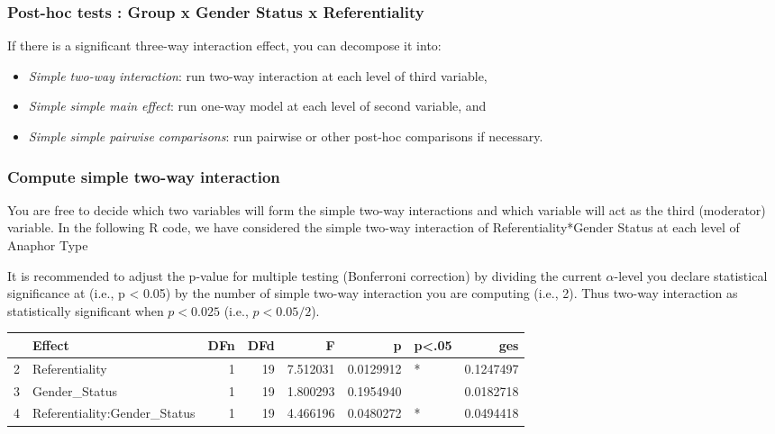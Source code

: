 \documentclass[
]{article}
\begin{document}
\subsubsection{Post-hoc tests : Group x Gender Status x
Referentiality}\label{post-hoc-tests-group-x-gender-status-x-referentiality}

If there is a significant three-way interaction effect, you can
decompose it into:

\begin{itemize}
\item
  \emph{Simple two-way interaction}: run two-way interaction at each
  level of third variable,
\item
  \emph{Simple simple main effect}: run one-way model at each level of
  second variable, and
\item
  \emph{Simple simple pairwise comparisons}: run pairwise or other
  post-hoc comparisons if necessary.
\end{itemize}

\subsubsection{Compute simple two-way
interaction}\label{compute-simple-two-way-interaction}

You are free to decide which two variables will form the simple two-way
interactions and which variable will act as the third (moderator)
variable. In the following R code, we have considered the simple two-way
interaction of Referentiality*Gender Status at each level of Anaphor
Type

It is recommended to adjust the p-value for multiple testing (Bonferroni
correction) by dividing the current \(\alpha\)-level you declare
statistical significance at (i.e., p \textless{} 0.05) by the number of
simple two-way interaction you are computing (i.e., 2). Thus two-way
interaction as statistically significant when \(p < 0.025\) (i.e.,
\(p < 0.05/2\)).

\begin{table}

\centering
\begin{tabular}[t]{l|l|r|r|r|r|l|r}
\hline
  & Effect & DFn & DFd & F & p & p<.05 & ges\\
\hline
2 & Referentiality & 1 & 19 & 7.512031 & 0.0129912 & * & 0.1247497\\
\hline
3 & Gender\_Status & 1 & 19 & 1.800293 & 0.1954940 &  & 0.0182718\\
\hline
4 & Referentiality:Gender\_Status & 1 & 19 & 4.466196 & 0.0480272 & * & 0.0494418\\
\hline
\end{tabular}
\end{table}
\end{document}

